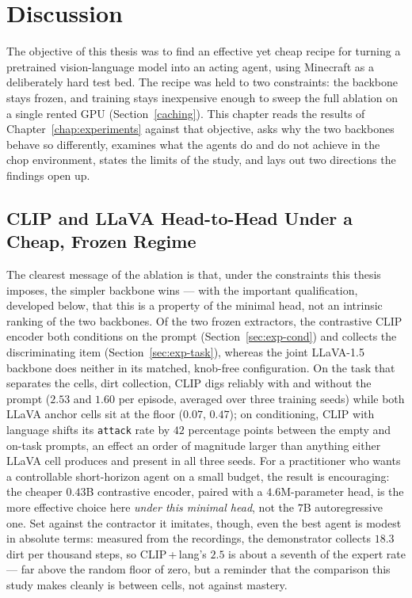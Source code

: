 \chapter{Discussion}
\label{chap:discussion}

The objective of this thesis was to find an effective yet cheap recipe for
turning a pretrained vision-language model into an acting agent, using Minecraft
as a deliberately hard test bed. The recipe was held to two constraints: the
backbone stays frozen, and training stays inexpensive enough to sweep the full
ablation on a single rented GPU (Section~\ref{caching}). This chapter reads the
results of Chapter~\ref{chap:experiments} against that objective, asks why the
two backbones behave so differently, examines what the agents do and do not
achieve in the chop environment, states the limits of the study, and lays out
two directions the findings open up.

\section{CLIP and LLaVA Head-to-Head Under a Cheap, Frozen Regime}
\label{sec:disc-headtohead}

The clearest message of the ablation is that, under the constraints this thesis
imposes, the simpler backbone wins --- with the important qualification,
developed below, that this is a property of the minimal head, not an intrinsic
ranking of the two backbones. Of the two frozen extractors, the
contrastive CLIP encoder both conditions on the prompt
(Section~\ref{sec:exp-cond}) and collects the discriminating item
(Section~\ref{sec:exp-task}), whereas the joint LLaVA-1.5 backbone does neither
in its matched, knob-free configuration. On the task that separates the cells,
dirt collection, CLIP digs reliably with and without the prompt ($2.53$ and
$1.60$ per episode, averaged over three training seeds) while both LLaVA anchor
cells sit at the floor ($0.07$, $0.47$); on conditioning, CLIP with language
shifts its \texttt{attack} rate by $42$ percentage points between the empty and
on-task prompts, an effect an order of magnitude larger than anything either
LLaVA cell produces and present in all three seeds. For a practitioner who wants
a controllable short-horizon agent on a small budget, the result is encouraging:
the cheaper $0.43$B contrastive encoder, paired with a $4.6$M-parameter head, is
the more effective choice here \emph{under this minimal head}, not the $7$B
autoregressive one. Set against the contractor it imitates, though, even the best
agent is modest in absolute terms: measured from the recordings, the demonstrator
collects $18.3$ dirt per thousand steps, so CLIP\,+\,lang's $2.5$ is about a
seventh of the expert rate --- far above the random floor of zero, but a reminder
that the comparison this study makes cleanly is between cells, not against
mastery.

